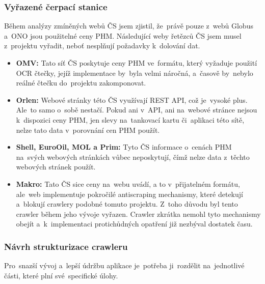 \subsubsection{Vyřazené čerpací stanice}
\label{sec:preps-removed-stations}

Během analýzy zmíněných webů ČS jsem zjistil, že~právě pouze z~webů
Globus a~ONO jsou použitelné ceny PHM. Následující weby řetězců ČS
jsem musel z~projektu vyřadit, neboť nesplňují požadavky k~dolování dat.

\begin{itemize}
    \item \textbf{OMV:} Tato síť ČS poskytuje ceny PHM ve~formátu,
        který vyžaduje použití OCR čtečky, jejíž implementace
        by~byla velmi náročná, a~časově by~nebylo reálné čtečku
        do~projektu zakomponovat.
    \item \textbf{Orlen:} Webové stránky této ČS využívají REST API,
        což je~vysoké plus. Ale~to samo o~sobě nestačí. Pokud ani
        v~API, ani na~webové stránce nejsou k~dispozici ceny PHM,
        jen slevy na~tankovací kartu či~aplikaci této sítě, nelze
        tato data v~porovnání cen PHM použít.
    \item \textbf{Shell, EuroOil, MOL a Prim:} Tyto ČS informace
        o~cenách PHM na~svých webových stránkách vůbec neposkytují,
        čímž nelze data z~těchto webových stránek použít.
    \item \textbf{Makro:} Tato ČS sice ceny na~webu uvádí, a to
        v~přijatelném formátu, ale~web implementuje pokročilé
        antiscraping mechanismy, které detekují a~blokují crawlery
        podobné tomuto projektu. Z~toho důvodu byl tento crawler
        během jeho vývoje vyřazen. Crawler zkrátka nemohl tyto
        mechanismy obejít a~k~implementaci protichůdných opatření
        již nezbýval dostatek času.
\end{itemize}

\subsubsection{Návrh strukturizace crawleru}
\label{sec:preps-crawler-structure}

Pro~snazší vývoj a~lepší údržbu aplikace je~potřeba ji~rozdělit na~jednotlivé
části, které plní své~specifické úlohy.

